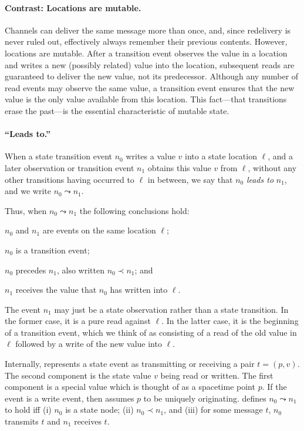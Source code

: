 \paragraph{Contrast:  Locations are mutable.}  Channels can deliver
the same message more than once, and, since redelivery is never ruled
out, effectively always remember their previous contents.  However,
locations are mutable.  After a transition event observes the value in
a location and writes a new (possibly related) value into the
location, subsequent reads are guaranteed to deliver the new value,
not its predecessor.  Although any number of read events may observe
the same value, a transition event ensures that the new value is the
only value available from this location.  This fact---that transitions
erase the past---is the essential characteristic of mutable state.

\paragraph{``Leads to.''}  When a state transition event $n_0$ writes
a value $v$ into a state location $\ell$, and a later observation or
transition event $n_1$ obtains this value $v$ from $\ell$, without any
other transitions having occurred to $\ell$ in between, we say that
$n_0$ \emph{leads to} $n_1$, and we write $n_0\leadsto n_1$.

Thus, when $n_0\leadsto n_1$ the following conclusions hold:
\begin{renumerate}
  \item $n_0$ and $n_1$ are events on the same location $\ell$;
  \item  $n_0$ is a transition event;
  \item $n_0$ precedes $n_1$, also written $n_0\prec n_1$; and
  \item $n_1$ receives the value that $n_0$ has written into $\ell$.
\end{renumerate}
%
The event $n_1$ may just be a state observation rather than a state
transition.  In the former case, it is a pure read against $\ell$.  In
the latter case, it is the beginning of a transition event, which we
think of as consisting of a read of the old value in $\ell$ followed
by a write of the new value into $\ell$.

Internally, {\cpsa} represents a state event as transmitting or
receiving a pair $t=(p,v)$.  The second component is the state value
$v$ being read or written.  The first component is a special value
which is thought of as a spacetime point $p$.  If the event is a write
event, then {\cpsa} assumes $p$ to be uniquely originating.  {\cpsa}
defines $n_0\leadsto n_1$ to hold iff (i) $n_0$ is a state node; (ii)
$n_0\prec n_1$, and (iii) for some message $t$, $n_0$ transmits $t$
and $n_1$ receives $t$.

